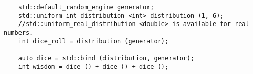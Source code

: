 \begin{lstlisting}
	std::default_random_engine generator;
	std::uniform_int_distribution <int> distribution (1, 6);
	//std::uniform_real_distribution <double> is available for real numbers.
	int dice_roll = distribution (generator);

	auto dice = std::bind (distribution, generator);
	int wisdom = dice () + dice () + dice ();
\end{lstlisting}


